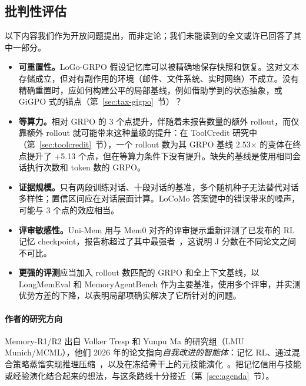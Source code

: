\subsection{批判性评估}\label{sec:memory-critique}
以下内容我们作为开放问题提出，而非定论；我们未能读到的全文或许已回答了其中一部分。
\begin{itemize}
\item \textbf{可重置性。}LoGo-GRPO 假设记忆库可以被精确地保存快照和恢复。这对文本存储成立，但对有副作用的环境（邮件、文件系统、实时网络）不成立。没有精确重置时，应如何构建公平的局部基线，例如借助学到的状态抽象，或 GiGPO 式的锚点（第~\ref{sec:tax-gigpo}~节）？
\item \textbf{等算力。}相对 GRPO 的 3 个点提升，伴随着未报告数量的额外 rollout，而仅靠额外 rollout 就可能带来这种量级的提升：在 ToolCredit 研究中（第~\ref{sec:toolcredit}~节），一个 rollout 数为其 GRPO 基线 2.53$\times$ 的变体在终点提升了 +5.13 个点，但在等算力条件下没有提升。缺失的基线是使用相同会话执行次数和 token 数的 GRPO。
\item \textbf{证据规模。}只有两段训练对话、十段对话的基准，多个随机种子无法替代对话多样性；置信区间应在对话层面计算。LoCoMo 答案键中的错误带来的噪声，可能与 3 个点的效应相当。
\item \textbf{评审敏感性。}Uni-Mem 用与 Mem0 对齐的评审提示重新评测了已发布的 RL 记忆 checkpoint，报告称超过了其中最强者~\citep{unimem2026}，这说明 J 分数在不同论文之间不可比。
\item \textbf{更强的评测}应当加入 rollout 数匹配的 GRPO 和全上下文基线，以 LongMemEval 和 MemoryAgentBench 作为主要基准，使用多个评审，并实测优势方差的下降，以表明局部项确实解决了它所针对的问题。
\end{itemize}

\paragraph{作者的研究方向}
Memory-R1/R2 出自 Volker Tresp 和 Yunpu Ma 的研究组（LMU Munich/MCML\unverified），他们 2026 年的论文指向\emph{自我改进的智能体}：记忆 RL、通过混合策略蒸馏实现推理压缩~\citep{yang2026reasoning}，以及在冻结骨干上的元技能演化~\citep{wang2026metaskill}。把记忆信用与技能或经验演化结合起来的想法，与这条路线十分接近（第~\ref{sec:agenda}~节）。
